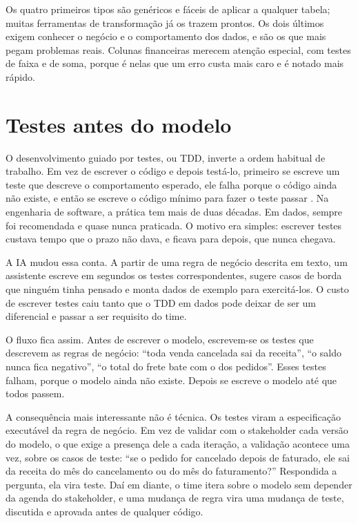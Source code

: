 Os quatro primeiros tipos são genéricos e fáceis de aplicar a qualquer tabela; muitas
ferramentas de transformação já os trazem prontos. Os dois últimos exigem conhecer o negócio
e o comportamento dos dados, e são os que mais pegam problemas reais. Colunas financeiras
merecem atenção especial, com testes de faixa e de soma, porque é nelas que um erro custa
mais caro e é notado mais rápido.


\section{Testes antes do modelo}
\label{sec:tdd}

O desenvolvimento guiado por testes, ou TDD, inverte a ordem habitual de trabalho. Em vez de
escrever o código e depois testá-lo, primeiro se escreve um teste que descreve o
comportamento esperado, ele falha porque o código ainda não existe, e então se escreve o
código mínimo para fazer o teste passar \parencite{beck2003}. Na engenharia de software, a
prática tem mais de duas décadas. Em dados, sempre foi recomendada e quase nunca praticada. O
motivo era simples: escrever testes custava tempo que o prazo não dava, e ficava para depois,
que nunca chegava.

A IA mudou essa conta. A partir de uma regra de negócio descrita em texto, um assistente
escreve em segundos os testes correspondentes, sugere casos de borda que ninguém tinha
pensado e monta dados de exemplo para exercitá-los. O custo de escrever testes caiu tanto
que o TDD em dados pode deixar de ser um diferencial e passar a ser requisito do time.

O fluxo fica assim. Antes de escrever o modelo, escrevem-se os testes que descrevem as regras
de negócio: \enquote{toda venda cancelada sai da receita}, \enquote{o saldo nunca fica
negativo}, \enquote{o total do frete bate com o dos pedidos}. Esses testes falham, porque o
modelo ainda não existe. Depois se escreve o modelo até que todos passem.

A consequência mais interessante não é técnica. Os testes viram a especificação executável da
regra de negócio. Em vez de validar com o stakeholder cada versão do modelo, o que exige a
presença dele a cada iteração, a validação acontece uma vez, sobre os casos de teste:
\enquote{se o pedido for cancelado depois de faturado, ele sai da receita do mês do
cancelamento ou do mês do faturamento?} Respondida a pergunta, ela vira teste. Daí em diante,
o time itera sobre o modelo sem depender da agenda do stakeholder, e uma mudança de regra vira
uma mudança de teste, discutida e aprovada antes de qualquer código.

